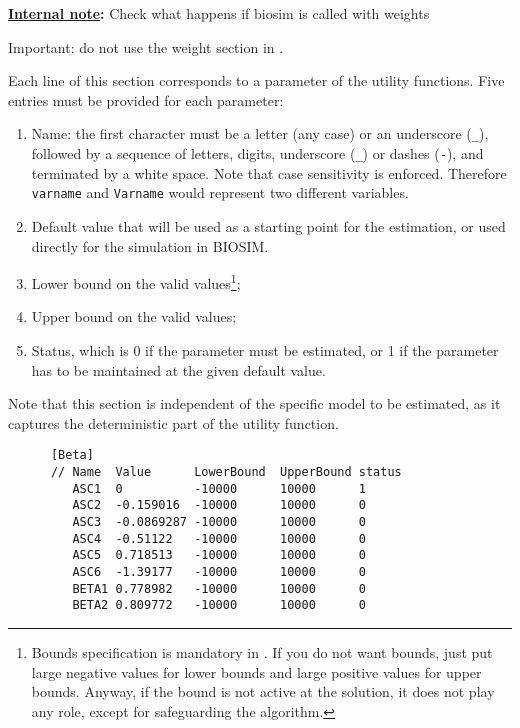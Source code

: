\documentclass[12pt]{memoir}
\newcommand{\note}[1]{
\begin{framed}{}%
\textbf{\underline{Internal note}:} #1
\end{framed}}
\begin{document}
\begin{description}
\note{Check what happens if biosim is called with weights}
      Important: do not use the weight section in \BIOSIM .

   \item[\specitem{Beta}]
      Each line of this section corresponds to a parameter of the utility
      functions. Five entries must be provided for each parameter:
      \begin{enumerate}
         \item Name: the first character must be a letter (any case) or an underscore
            (\verb+_+), followed by a sequence of letters, digits, underscore (\verb+_+)
            or dashes (\verb+-+), and terminated by a white space. Note that case sensitivity is enforced. 
            Therefore \verb+varname+ and \verb+Varname+ would represent two different variables.
         \item Default value that will be used as a starting point for the estimation, or used directly for the simulation in BIOSIM.
         \item Lower bound on the valid values\footnote{Bounds specification is mandatory in \BIOGEME. If you do not want bounds, just put large negative values for lower bounds and large positive values for upper bounds. Anyway, if the bound is not active at the solution, it does not play any role, except for safeguarding the algorithm.};
         \item Upper bound on the valid values;
         \item Status, which is 0 if the parameter must be estimated, or 1 if the parameter has to be maintained at the given default value. 
      \end{enumerate}
      Note that this section is independent of the specific model to be
      estimated, as it captures the deterministic part of the utility function.

      \small 
{\footnotesize
      \begin{verbatim}
      [Beta]
      // Name  Value      LowerBound  UpperBound status
         ASC1  0          -10000      10000      1
         ASC2  -0.159016  -10000      10000      0
         ASC3  -0.0869287 -10000      10000      0
         ASC4  -0.51122   -10000      10000      0
         ASC5  0.718513   -10000      10000      0
         ASC6  -1.39177   -10000      10000      0
         BETA1 0.778982   -10000      10000      0
         BETA2 0.809772   -10000      10000      0
      \end{verbatim} 
}
      \normalsize


\end{description}
\end{document}
